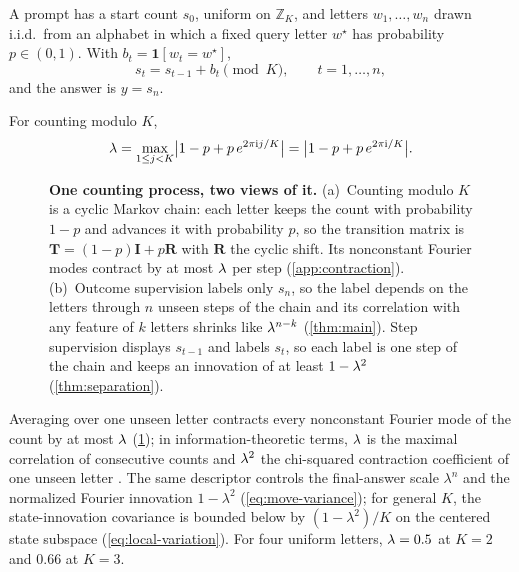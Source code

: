 \begin{definition}
\label{def:task}
A prompt has a start count $s_0$, uniform on $\mathbb Z_K$, and letters $w_1,\ldots,w_n$ drawn i.i.d.\ from an alphabet
in which a fixed query letter $w^\star$ has probability $p\in(0,1)$. With $b_t=\mathbf 1[w_t=w^\star]$,
\begin{equation}
 s_t=s_{t-1}+b_t\pmod K,\qquad t=1,\ldots,n,
 \label{eq:tracking}
\end{equation}
and the answer is $y=s_n$.
\end{definition}

\begin{definition}
\label{def:lambda}
For counting modulo $K$,
\begin{equation}
 \lambda=\max_{1\le j<K}\bigl|1-p+p\,e^{2\pi\mathrm ij/K}\bigr|=\bigl|1-p+p\,e^{2\pi\mathrm i/K}\bigr|.
 \label{eq:lambda}
\end{equation}
\end{definition}

\begin{figure}[t]
\centering
\resizebox{\linewidth}{!}{}
\caption{\textbf{One counting process, two views of it.}
(a)~Counting modulo $K$ is a cyclic Markov chain: each letter keeps the count with probability $1-p$ and advances it with probability
$p$, so the transition matrix is $\mathbf T=(1-p)\mathbf I+p\mathbf R$ with $\mathbf R$ the cyclic shift. Its nonconstant Fourier modes
contract by at most $\lambda$ per step (\cref{app:contraction}).
(b)~Outcome supervision labels only $s_n$, so the label depends on the letters through $n$ unseen steps of the chain and its
correlation with any feature of $k$ letters shrinks like $\lambda^{n-k}$ (\cref{thm:main}). Step supervision displays $s_{t-1}$ and labels $s_t$, so each label is one
step of the chain and keeps an innovation of at least $1-\lambda^2$ (\cref{thm:separation}).}
\label{fig:chain}
\end{figure}

Averaging over one unseen letter contracts every nonconstant Fourier mode of the count by at most $\lambda$ (\cref{fig:chain}); in information-theoretic terms,
$\lambda$ is the maximal correlation of consecutive counts and $\lambda^2$ the chi-squared contraction coefficient of one
unseen letter \citep{witsenhausen1975sequences,raginsky2016strong}.
The same descriptor controls the final-answer scale $\lambda^n$ and the
normalized Fourier innovation $1-\lambda^2$ (\cref{eq:move-variance}); for general
$K$, the state-innovation covariance is bounded below by
$(1-\lambda^2)/K$ on the centered state subspace (\cref{eq:local-variation}).
For four uniform letters,
$\lambda=0.5$ at $K=2$ and $0.66$ at $K=3$.

